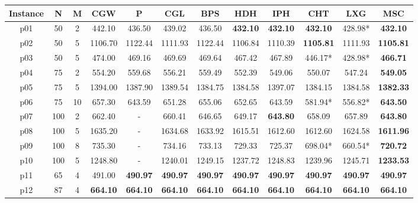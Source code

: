 \begin{table}[h!]
    \centering
    \small\addtolength{\tabcolsep}{-5pt}
    \begin{tabular}{|c|c|c|c|c|c|c|c|c|c|c|c|}
    \hline
    Instance & N      & M     & CGW     & P       & CGL     & BPS     & HDH     & IPH     & CHT     & LXG     & MSC      \\\hline
    p01      & 50  & 2  & 442.10  & 436.50  & 439.02  & 436.50  & \textbf{432.10}  & \textbf{432.10}  & \textbf{432.10}  & 428.98*  & \textbf{432.10}   \\\hline
    p02      & 50  & 5  & 1106.70 & 1122.44 & 1111.93 & 1122.44 & 1106.84 & 1110.39 & \textbf{1105.81} & 1111.93 & \textbf{1105.81}  \\\hline
    p03      & 50  & 5  & 474.00  & 469.16  & 469.69  & 469.64  & 467.42  & 467.89  & 446.17*  & 428.98*  & \textbf{466.71}   \\\hline
    p04      & 75  & 2  & 554.20  & 559.68  & 556.21  & 559.49  & 552.39  & 549.06  & 550.07  & 547.24  & \textbf{549.05}   \\\hline
    p05      & 75  & 5  & 1394.00 & 1387.90 & 1389.54 & 1384.75 & 1384.58 & 1397.07 & 1384.15 & 1384.58 & \textbf{1382.33}  \\\hline
    p06      & 75  & 10 & 657.30  & 643.59  & 651.28  & 655.06  & 652.65  & 643.59  & 581.94*  & 556.82*  & \textbf{643.50}   \\\hline
    p07      & 100 & 2  & 662.40  &    -     & 660.41  & 646.65  & 649.17  & \textbf{643.80}  & 658.09  & 657.89  & \textbf{643.80}   \\\hline
    p08      & 100 & 5 & 1635.20 &     -    & 1634.68 & 1633.92 & 1615.51 & 1612.60 & 1612.60 & 1624.58 & \textbf{1611.96}  \\\hline
    p09      & 100 & 8  & 735.30  &    -     & 734.16  & 733.13  & 729.33  & 725.37  & 698.04*  & 660.54*  & \textbf{720.72}   \\\hline
    p10      & 100 & 5  & 1248.80 &    -     & 1240.01 & 1249.15 & 1237.72 & 1248.83 & 1239.96 & 1245.71 & \textbf{1233.53}  \\\hline
    p11      & 65  & 4  & 491.00&\textbf{490.97}&\textbf{490.97}&\textbf{490.97}&\textbf{490.97}&\textbf{490.97}&\textbf{490.97}&\textbf{490.97}& \textbf{490.97}   \\\hline
    p12      & 87  & 4  & \textbf{664.10}  & \textbf{664.10}  & \textbf{664.10}  & \textbf{664.10}  & \textbf{664.10}  & \textbf{664.10}  & \textbf{664.10}  & \textbf{664.10}  & \textbf{664.10}   \\\hline

\end{tabular}
\end{table}
